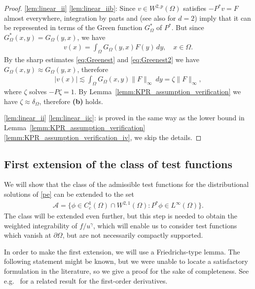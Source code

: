 \documentclass[12pt,a4paper]{amsart}
\theoremstyle{definition}
\begin{document}
\begin{proof}
    \noindent \ref{lem:linear_ii} \ref{lem:linear_iib}: Since $v\in W^{2,p}(\Omega)$ satisfies $-P^*v = F$ almost everywhere, integration by parts and \cite[Lemma~1.7 and Theorem~1.9]{MR4056785} (see also \cite{MR4301407} for $d=2$) imply that it can be represented in terms of the Green function $G^*_\Omega$ of $P^*$. But since $G^*_\Omega(x,y) = G_\Omega(y,x)$, we have 
    \begin{align*}
        v(x) = \int_\Omega G_\Omega(y,x)F(y)\, dy,\quad x\in \Omega.
    \end{align*}
    By the sharp estimates \eqref{eq:Greenest} and \eqref{eq:Greenest2} we have $G_\Omega(x,y) \approx G_\Omega(y,x)$, therefore 
    \begin{align*}
        |v(x)| \lesssim \int_\Omega G_\Omega(x,y)\|F\|_\infty\ dy = \zeta \|F\|_\infty,
    \end{align*}
    where $\zeta$ solves $-P\zeta = 1$. By Lemma~\ref{lemm:KPR_assumption_verification} we have $\zeta \approx \delta_\Omega$, therefore \textbf{(b)} holds.\medskip
    
    \noindent \ref{lem:linear_ii} \ref{lem:linear_iic}: is proved in the same way as the lower bound in Lemma~\ref{lemm:KPR_assumption_verification} \ref{lemm:KPR_assumption_verification_iv}, we skip the details.
\end{proof}

\subsection{First extension of the class of test functions}\label{sec:firstextension}
We will show that the class of the admissible test functions for the distributional solutions of \eqref{pe} can be extended to the set
\begin{align}\label{eq:firstextension}
    \mathcal{A} = \{\phi\in C^1_c(\Omega)\cap W^{2,1}(\Omega): P^*\phi\in L^\infty(\Omega)\}.
\end{align}
The class will be extended even further, but this step is needed to obtain the weighted integrability of $f/u^\gamma$, which will enable us to consider test functions which vanish at $\partial \Omega$, but are not necessarily compactly supported.

In order to make the first extension, we will use a Friedrichs-type lemma. The following statement might be known, but we were unable to locate a satisfactory formulation in the literature, so we give a proof for the sake of completeness. See e.g.~\cite[Corollary~3.3]{MR1732050} for a related result for the first-order derivatives.
\end{document}
